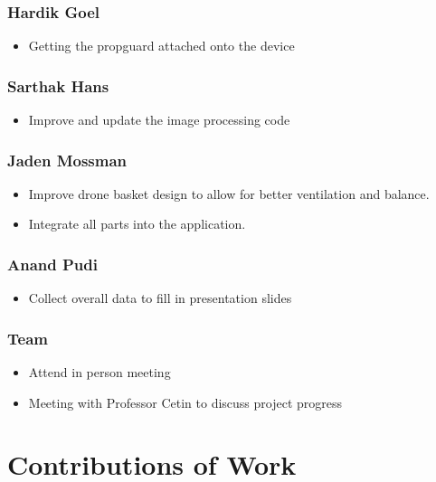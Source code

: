 \documentclass[12pt]{article}
\begin{document}
            \subsubsection*{Hardik Goel}
                \begin{itemize}
                    \item Getting the propguard attached onto the device
                \end{itemize}
            \subsubsection*{Sarthak Hans}
                \begin{itemize}
                    \item Improve and update the image processing code
                \end{itemize}
            \subsubsection*{Jaden Mossman}
                \begin{itemize}
                    \item Improve drone basket design to allow for better ventilation and balance.
                    \item Integrate all parts into the application.
                \end{itemize}
            \subsubsection*{Anand Pudi}
                \begin{itemize}
                    \item Collect overall data to fill in presentation slides
                \end{itemize}
            \subsubsection*{Team}
                \begin{itemize}
                    \item Attend in person meeting
                    \item Meeting with Professor Cetin to discuss project progress
                \end{itemize}

    \newpage
    \section{Contributions of Work}
\end{document}
